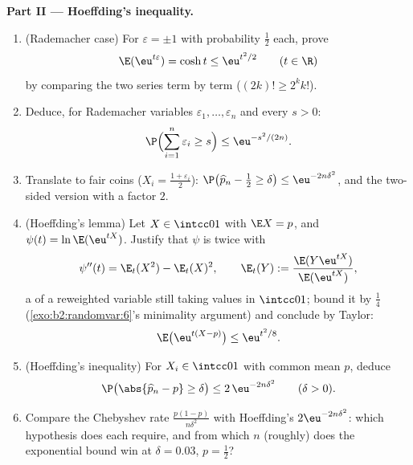 \begin{problem}
\medskip
\noindent\textbf{Part II --- Hoeffding's inequality.}
\begin{enumerate}[resume]
  \item (Rademacher case) For $\varepsilon = \pm1$ with
        probability $\frac12$ each, prove
        \[
        \E(\eu^{t\varepsilon}) = \cosh t \leq \eu^{t^2/2}
        \qquad (t \in \R)
        \]
        by comparing the two series term by term ($(2k)! \geq
        2^kk!$).
  \item Deduce, for  Rademacher variables
        $\varepsilon_1, \dots, \varepsilon_n$ and every $s >
        0$:
        \[
        \P\Bigl(\sum_{i=1}^n\varepsilon_i \geq s\Bigr)
        \leq \eu^{-s^2/(2n)} .
        \]
  \item Translate to fair coins ($X_i =
        \frac{1+\varepsilon_i}2$): $\P\bigl(\widehat p_n -
        \tfrac12 \geq \delta\bigr) \leq \eu^{-2n\delta^2}$,
        and the two-sided version with a factor $2$.
  \item (Hoeffding's lemma) Let $X \in \intcc01$ with $\E X =
        p$, and $\psi(t) = \ln\E(\eu^{tX})$. Justify that
        $\psi$ is twice  with
        \[
        \psi''(t) = \E_t(X^2) - \E_t(X)^2, \qquad
        \E_t(Y) := \frac{\E(Y\eu^{tX})}{\E(\eu^{tX})},
        \]
        a \emph{} of a reweighted variable still
        taking values in $\intcc01$; bound it by $\frac14$
        (\cref{exo:b2:randomvar:6}'s minimality argument) and
        conclude by Taylor:
        \[
        \E\bigl(\eu^{t(X - p)}\bigr) \leq \eu^{t^2/8} .
        \]
  \item (Hoeffding's inequality) For  $X_i \in
        \intcc01$ with common mean $p$, deduce
        \[
        \P\bigl(\abs{\widehat p_n - p} \geq \delta\bigr)
        \leq 2\,\eu^{-2n\delta^2}
        \qquad (\delta > 0).
        \]
  \item Compare the Chebyshev rate
        $\frac{p(1-p)}{n\delta^2}$ with Hoeffding's
        $2\eu^{-2n\delta^2}$: which hypothesis does each
        require, and from which $n$ (roughly) does the
        exponential bound win at $\delta = 0.03$, $p =
        \frac12$?
\end{enumerate}


\end{problem}
